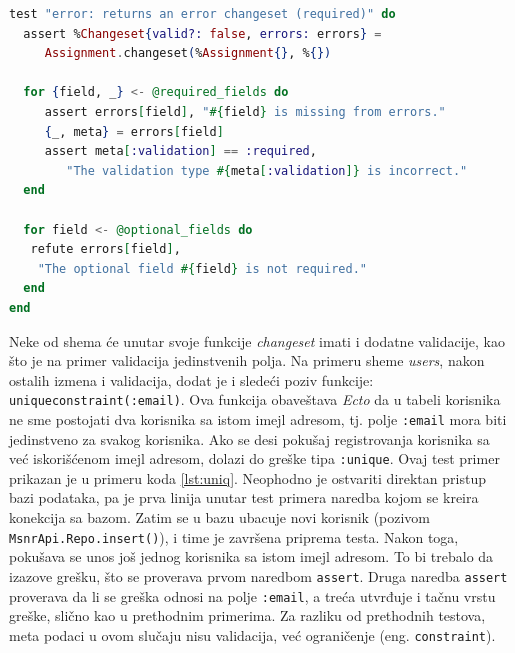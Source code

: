 \documentclass[12pt,oneside]{memoir}
\begin{document}
\begin{minipage}{\linewidth}
\begin{lstlisting}[language=elixir, basicstyle=\small, caption={Test primer neuspešne upotrebe funkcije \emph{changeset/2}, sa nedostajućim parametrima},captionpos=b, label={lst:req}]
test "error: returns an error changeset (required)" do
  assert %Changeset{valid?: false, errors: errors} =
     Assignment.changeset(%Assignment{}, %{})

  for {field, _} <- @required_fields do
     assert errors[field], "#{field} is missing from errors."
     {_, meta} = errors[field]
     assert meta[:validation] == :required,
        "The validation type #{meta[:validation]} is incorrect."
  end

  for field <- @optional_fields do
   refute errors[field],
    "The optional field #{field} is not required."
  end
end
\end{lstlisting}
\end{minipage}

\par Neke od shema će unutar svoje funkcije \emph{changeset} imati i dodatne validacije, kao što je na primer validacija jedinstvenih polja. Na primeru sheme \emph{users}, nakon ostalih izmena i validacija, dodat je i sledeći poziv funkcije: \texttt{unique{\textunderscore}constraint(:email)}. Ova funkcija obaveštava \emph{Ecto} da u tabeli korisnika ne sme postojati dva korisnika sa istom imejl adresom, tj. polje \texttt{:email} mora biti jedinstveno za svakog korisnika. Ako se desi pokušaj registrovanja korisnika sa već iskorišćenom imejl adresom, dolazi do greške tipa \texttt{:unique}. Ovaj test primer prikazan je u primeru koda \ref{lst:uniq}. Neophodno je ostvariti direktan pristup bazi podataka, pa je prva linija unutar test primera naredba kojom se kreira konekcija sa bazom. Zatim se u bazu ubacuje novi korisnik (pozivom \texttt{MsnrApi.Repo.insert()}), i time je završena priprema testa. Nakon toga, pokušava se unos još jednog korisnika sa istom imejl adresom. To bi trebalo da izazove grešku, što se proverava prvom naredbom \texttt{assert}. Druga naredba \texttt{assert} proverava da li se greška odnosi na polje \texttt{:email}, a treća utvrđuje i tačnu vrstu greške, slično kao u prethodnim primerima. Za razliku od prethodnih testova, meta podaci u ovom slučaju nisu validacija, već ograničenje (eng. \texttt{constraint}). \\
\end{document}
